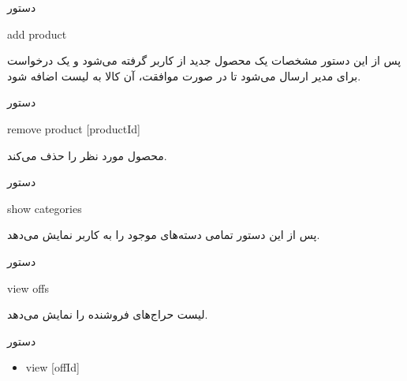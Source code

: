 \documentclass[]{article}
\begin{document}
\begin{mybox}[colback=yellow]{دستور}

\begin{latin}

add product 

\end{latin}

\end{mybox}


پس از این دستور مشخصات یک محصول جدید از کاربر گرفته می‌شود و یک درخواست برای مدیر ارسال می‌شود تا در صورت موافقت، آن کالا به لیست اضافه شود.

\hrulefill

\begin{mybox}[colback=yellow]{دستور}

\begin{latin}

remove product [productId] 

\end{latin}

\end{mybox}

محصول مورد نظر را حذف می‌کند.


\hrulefill

\newpage

\begin{mybox}[colback=yellow]{دستور}

\begin{latin}

show categories 

\end{latin}

\end{mybox}

پس از این دستور تمامی دسته‌های موجود را به کاربر نمایش می‌دهد.

\hrulefill

\begin{mybox}[colback=yellow]{دستور}

\begin{latin}

view offs

\end{latin}

\end{mybox}

لیست حراج‌های فروشنده را نمایش می‌دهد.


\begin{mybox}[colback=brilliantlavender]{دستور}

\begin{latin}

\begin{itemize}[label = {$\Rightarrow$}]

\item
view [offId]

\end{itemize}

\end{latin}

\end{mybox}
\end{document}
